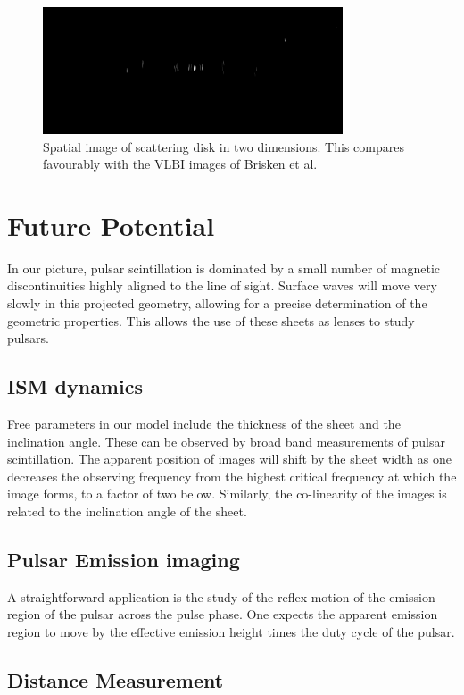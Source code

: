 \documentclass[useAMS,usenatbib]{mn2e}
\begin{document}
\begin{figure}
\centerline{\includegraphics[width=3.5in]{image86.png}}
\caption{Spatial image of scattering disk in two dimensions.  This
  compares favourably with the VLBI images of Brisken et al.
}
\label{fig:2d}
\end{figure}

\section{Future Potential}

In our picture, pulsar scintillation is dominated by a small number of
magnetic discontinuities highly aligned to the line of sight.  Surface
waves will move very slowly in this projected geometry, allowing for a
precise determination of the geometric properties.  This allows the
use of these sheets as lenses to study pulsars.  

\subsection{ISM dynamics}

Free parameters in our model include the thickness of the sheet and the
inclination angle.  These can be observed by broad band measurements
of pulsar scintillation. The apparent position of images will shift by
the sheet width as one decreases the observing frequency from the
highest critical frequency at which the image forms, to a factor of
two below.  Similarly, the co-linearity of the images is related to
the inclination angle of the sheet.

\subsection{Pulsar Emission imaging}

A straightforward application is the study of the reflex motion of the
emission region of the pulsar across the pulse phase.  One expects the
apparent emission region to move by the effective emission height
times the duty cycle of the pulsar.

\subsection{Distance Measurement}
\end{document}
